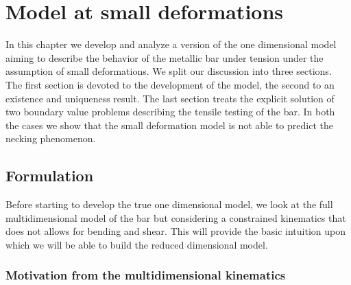 \documentclass[a4paper,10pt,oneside]{amsbook}
\numberwithin{section}{chapter}
\numberwithin{equation}{chapter}
\theoremstyle{definition}
\begin{document}
\chapter{Model at small deformations}
\label{chap:small-neck}

In this chapter we develop and analyze a version of the one dimensional model aiming to describe the behavior of the metallic bar under tension under the assumption of small deformations. We split our discussion into three sections. The first section is devoted to the development of the model, the second to an existence and uniqueness result. The last section treats the explicit solution of two boundary value problems describing the tensile testing of the bar. In both the cases we show that the small deformation model is not able to predict the necking phenomenon. 

\section{Formulation}
\label{sec:small-model-1d}

Before starting to develop the true one dimensional model, we look at the full multidimensional model of the bar but considering a constrained kinematics that does not allows for bending and shear. This will provide the basic intuition upon which we will be able to build the reduced dimensional model.

\subsection{Motivation from the multidimensional kinematics}
\end{document}

